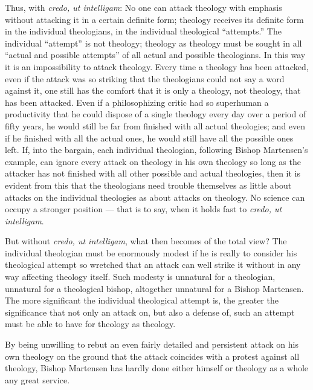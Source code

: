 \documentclass[12pt]{book}
\newcommand{\opage}[1]{\marginnote{\footnotesize\textit{[#1]}}}
\begin{document}
Thus, with \textit{credo, ut intelligam}: No one can attack theology with emphasis without attacking it in a certain definite form; theology receives its definite form in the individual theologians, in the individual theological ``attempts.'' The individual ``attempt'' is not theology; theology as theology must be sought in all ``actual and possible attempts'' of all actual and possible theologians. In this way it is an impossibility to attack theology. Every time a theology has been attacked, even if the attack was so striking that the theologians could not say a word against it, one still has the comfort that it is only a theology, not theology, that has been attacked. Even if a philosophizing critic had so superhuman a productivity that he could dispose of a single theology every day over a period of fifty years, he would still be far from finished with all actual theologies; and even if he finished with all the actual ones, he would still have all the possible ones left. If, into the bargain, each individual theologian, following Bishop Martensen's example, can ignore every attack on theology in his own theology so long as the attacker has not
\opage{79}\setcounter{footnote}{0}%
finished with all other possible and actual theologies, then it is evident from this that the theologians need trouble themselves as little about attacks on the individual theologies as about attacks on theology. No science can occupy a stronger position --- that is to say, when it holds fast to \textit{credo, ut intelligam}.

But without \textit{credo, ut intelligam}, what then becomes of the total view? The individual theologian must be enormously modest if he is really to consider his theological attempt so wretched that an attack can well strike it without in any way affecting theology itself. Such modesty is unnatural for a theologian, unnatural for a theological bishop, altogether unnatural for a Bishop Martensen. The more significant the individual theological attempt is, the greater the significance that not only an attack on, but also a defense of, such an attempt must be able to have for theology as theology.

By being unwilling to rebut an even fairly detailed and persistent attack on his own theology on the ground that the attack coincides with a protest against all theology, Bishop Martensen has hardly done either himself or theology as a whole any great service.
\end{document}
